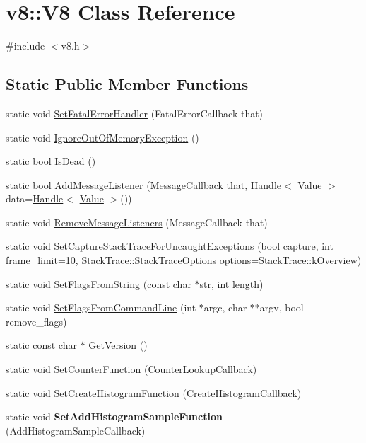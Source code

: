 \hypertarget{classv8_1_1_v8}{}\section{v8\+:\+:V8 Class Reference}
\label{classv8_1_1_v8}


{\ttfamily \#include $<$v8.\+h$>$}

\subsection*{Static Public Member Functions}
\begin{DoxyCompactItemize}
\item 
static void \hyperlink{classv8_1_1_v8_ab386f81a6d58dcf481d00446e8d15c9e}{Set\+Fatal\+Error\+Handler} (Fatal\+Error\+Callback that)
\item 
static void \hyperlink{classv8_1_1_v8_a1058ff39b32a17976df1e2b75c3d1cb4}{Ignore\+Out\+Of\+Memory\+Exception} ()
\item 
static bool \hyperlink{classv8_1_1_v8_a0d5593ecf0d41035e4d9ee512119f0b7}{Is\+Dead} ()
\item 
static bool \hyperlink{classv8_1_1_v8_a125dadf8feb6178a42333f2a6412ea73}{Add\+Message\+Listener} (Message\+Callback that, \hyperlink{classv8_1_1_handle}{Handle}$<$ \hyperlink{classv8_1_1_value}{Value} $>$ data=\hyperlink{classv8_1_1_handle}{Handle}$<$ \hyperlink{classv8_1_1_value}{Value} $>$())
\item 
static void \hyperlink{classv8_1_1_v8_a024f57744e8dfdcb2ea1417024b4805c}{Remove\+Message\+Listeners} (Message\+Callback that)
\item 
static void \hyperlink{classv8_1_1_v8_a9998ccddad62571d73039ea12f598236}{Set\+Capture\+Stack\+Trace\+For\+Uncaught\+Exceptions} (bool capture, int frame\+\_\+limit=10, \hyperlink{classv8_1_1_stack_trace_a9704e4a37949eb8eb8ccddbddf161492}{Stack\+Trace\+::\+Stack\+Trace\+Options} options=Stack\+Trace\+::k\+Overview)
\item 
static void \hyperlink{classv8_1_1_v8_ab263a85e6f97ea79d944bd20bb09a95f}{Set\+Flags\+From\+String} (const char $\ast$str, int length)
\item 
static void \hyperlink{classv8_1_1_v8_a63157ad9284ffad1c0ab62b21aadd08c}{Set\+Flags\+From\+Command\+Line} (int $\ast$argc, char $\ast$$\ast$argv, bool remove\+\_\+flags)
\item 
static const char $\ast$ \hyperlink{classv8_1_1_v8_afcecc0e9e8b5fa17a06a93f7b5a7538d}{Get\+Version} ()
\item 
static void \hyperlink{classv8_1_1_v8_a830d3ba2704b6e7c361188b22318c0be}{Set\+Counter\+Function} (Counter\+Lookup\+Callback)
\item 
static void \hyperlink{classv8_1_1_v8_ac4db0dff0f29c750d30fcac65c4d1968}{Set\+Create\+Histogram\+Function} (Create\+Histogram\+Callback)
\item 
\hypertarget{classv8_1_1_v8_acbd552ca4282f1a7648c221aa70ff93e}{}static void {\bfseries Set\+Add\+Histogram\+Sample\+Function} (Add\+Histogram\+Sample\+Callback)\label{classv8_1_1_v8_acbd552ca4282f1a7648c221aa70ff93e}


\end{DoxyCompactItemize}
